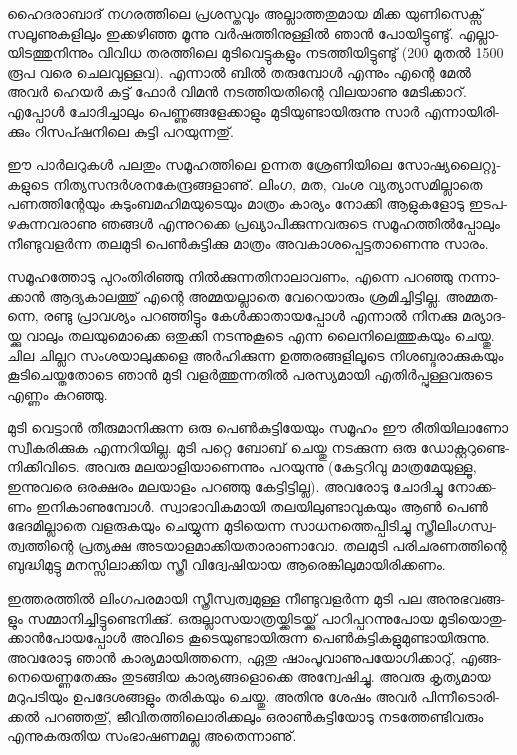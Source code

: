 ­ഹൈ­ദ­രാ­ബാ­ദ് നഗ­ര­ത്തി­ലെ പ്ര­ശ­സ്ത­വും അല്ലാ­ത്ത­തു­മായ മി­ക്ക യു­ണി­സെ­ക്സ് സലൂ­ണു­ക­ളി­ലും ഇക്ക­ഴി­ഞ്ഞ മൂ­ന്നു 
വര്‍­ഷ­ത്തി­നു­ള്ളില്‍ ഞാന്‍ പോ­യി­ട്ടു­ണ്ടു്. എല്ലാ­യി­ട­ത്തു­നി­ന്നും വി­വിധ തര­ത്തി­ലെ മു­ടി­വെ­ട്ടു­ക­ളും നട­ത്തി­യി­ട്ടു­ണ്ടു് (200 
‌മു­തല്‍ 1500 രൂപ വരെ ചെ­ല­വു­ള്ള­വ). എന്നാല്‍ ബില്‍ തരു­മ്പോള്‍ എന്നും എന്റെ മേല്‍ അവര്‍ ഹെ­യര്‍ കട്ട് ഫോര്‍ 
വി­മന്‍ നട­ത്തി­യ­തി­ന്റെ വി­ല­യാ­ണു മേ­ടി­ക്കാ­റ്. എപ്പോള്‍ ചോ­ദി­ച്ചാ­ലും പെ­ണ്ണു­ങ്ങ­ളേ­ക്കാ­ളും മു­ടി­യു­ണ്ടാ­യി­രു­ന്നു സാര്‍ 
എന്നാ­യി­രി­ക്കും റി­സ­പ്ഷ­നി­ലെ കു­ട്ടി പറ­യു­ന്ന­തു്.

ഈ പാര്‍­ല­റു­കള്‍ പല­തും സമൂ­ഹ­ത്തി­ലെ ഉന്നത ശ്രേ­ണി­യി­ലെ സോ­ഷ്യ­ലൈ­റ്റു­ക­ളു­ടെ നി­ത്യ­സ­ന്ദര്‍­ശ­ന­കേ­ന്ദ്ര­ങ്ങ­ളാ­ണു്. 
ലിം­ഗ, മത, വംശ വ്യ­ത്യാ­സ­മി­ല്ലാ­തെ പണ­ത്തി­ന്റേ­യും കു­ടും­ബ­മ­ഹി­മ­യു­ടെ­യും മാ­ത്രം കാ­ര്യം നോ­ക്കി ആളു­ക­ളോ­ടു 
ഇട­പ­ഴ­കു­ന്ന­വ­രാ­ണു ഞങ്ങള്‍ എന്നു­റ­ക്കെ പ്ര­ഖ്യാ­പി­ക്കു­ന്ന­വ­രു­ടെ സമൂ­ഹ­ത്തില്‍­പ്പോ­ലും നീ­ണ്ടു­വ­ളര്‍­ന്ന തല­മു­ടി പെണ്‍­കു­ട്ടി­ക്കു 
മാ­ത്രം അവ­കാ­ശ­പ്പെ­ട്ട­താ­ണെ­ന്നു സാ­രം­.

­സ­മൂ­ഹ­ത്തോ­ടു പു­റം­തി­രി­ഞ്ഞു നില്‍­ക്കു­ന്ന­തി­നാ­ലാ­വ­ണം, എന്നെ പറ­ഞ്ഞു നന്നാ­ക്കാന്‍ ആദ്യ­കാ­ല­ത്തു് എന്റെ 
അമ്മ­യ­ല്ലാ­തെ വേ­റെ­യാ­രും ശ്ര­മി­ച്ചി­ട്ടി­ല്ല. അമ്മ­ത­ന്നെ, രണ്ടു പ്രാ­വ­ശ്യം പറ­ഞ്ഞി­ട്ടും കേള്‍­ക്കാ­താ­യ­പ്പോള്‍ എന്നാല്‍ 
നി­ന­ക്കു മര്യാ­ദ­യ്ക്കു വാ­ലും തല­യു­മൊ­ക്കെ ഒതു­ക്കി നട­ന്നു­കൂ­ടെ എന്ന ലൈ­നി­ലെ­ത്തു­ക­യും ചെ­യ്തു. ചില ചി­ല്ലറ 
സം­ശ­യാ­ലു­ക്ക­ളെ അര്‍­ഹി­ക്കു­ന്ന ഉത്ത­ര­ങ്ങ­ളി­ലൂ­ടെ നി­ശ­ബ്ദ­രാ­ക്കു­ക­യും കൂ­ടി­ചെ­യ്ത­തോ­ടെ ഞാന്‍ മു­ടി വളര്‍­ത്തു­ന്ന­തില്‍ 
പര­സ്യ­മാ­യി എതിര്‍­പ്പു­ള്ള­വ­രു­ടെ എണ്ണം കു­റ­ഞ്ഞു­.

­മു­ടി വെ­ട്ടാന്‍ തീ­രു­മാ­നി­ക്കു­ന്ന ഒരു പെണ്‍­കു­ട്ടി­യേ­യും സമൂ­ഹം ഈ രീ­തി­യി­ലാ­ണോ സ്വീ­ക­രി­ക്കുക എന്ന­റി­യി­ല്ല. മു­ടി പറ്റെ 
ബോ­ബ് ചെ­യ്തു നട­ക്കു­ന്ന ഒരു ഡോ­ക്റ്റ­റു­ണ്ടെ­നി­ക്കി­വി­ടെ. അവ­രു മല­യാ­ളി­യാ­ണെ­ന്നും പറ­യു­ന്നു (കേ­ട്ട­റി­വു മാ­ത്ര­മേ­യു­ള്ളൂ, 
ഇന്നു­വ­രെ ഒര­ക്ഷ­രം മല­യാ­ളം പറ­ഞ്ഞു കേ­ട്ടി­ട്ടി­ല്ല). അവ­രോ­ടു ചോ­ദി­ച്ചു നോ­ക്ക­ണം ഇനി­കാ­ണു­മ്പോള്‍. സ്വാ­ഭാ­വി­ക­മാ­യി 
തല­യി­ലു­ണ്ടാ­വു­ക­യും ആണ്‍ പെണ്‍ ഭേ­ദ­മി­ല്ലാ­തെ വള­രു­ക­യും ചെ­യ്യു­ന്ന മു­ടി­യെ­ന്ന സാ­ധ­ന­ത്തെ­പ്പി­ടി­ച്ചു 
സ്ത്രീ­ലിം­ഗ­സ്വ­ത്വ­ത്തി­ന്റെ പ്ര­ത്യ­ക്ഷ അട­യാ­ള­മാ­ക്കി­യ­താ­രാ­ണാ­വോ. തല­മു­ടി പരി­ച­ര­ണ­ത്തി­ന്റെ ബു­ദ്ധി­മു­ട്ടു മന­സ്സി­ലാ­ക്കിയ സ്ത്രീ 
വി­ദ്വേ­ഷി­യായ ആരെ­ങ്കി­ലു­മാ­യി­രി­ക്ക­ണം­.

ഇ­ത്ത­ര­ത്തില്‍ ലിം­ഗ­പ­ര­മാ­യി സ്ത്രീ­സ്വ­ത്വ­മു­ള്ള നീ­ണ്ടു­വ­ളര്‍­ന്ന മു­ടി പല അനു­ഭ­വ­ങ്ങ­ളും സമ്മാ­നി­ച്ചി­ട്ടു­ണ്ടെ­നി­ക്കു്. 
ഒരു­ല്ലാ­സ­യാ­ത്ര­യ്ക്കി­ട­യ്ക്കു് പാ­റി­പ്പ­റ­ന്നു­പോയ മു­ടി­യൊ­തു­ക്കാന്‍­പോ­യ­പ്പോള്‍ അവി­ടെ കൂ­ടെ­യു­ണ്ടാ­യി­രു­ന്ന 
പെണ്‍­കു­ട്ടി­ക­ളു­മു­ണ്ടാ­യി­രു­ന്നു. അവ­രോ­ടു ഞാന്‍ കാ­ര്യ­മാ­യി­ത്ത­ന്നെ, ഏതു ഷാം­പൂ­വാ­ണു­പ­യോ­ഗി­ക്കാ­റു്, എങ്ങ­നെ­യെ­ണ്ണ­തേ­ക്കും 
തു­ട­ങ്ങിയ കാ­ര്യ­ങ്ങ­ളൊ­ക്കെ അന്വേ­ഷി­ച്ചു. അവ­രു കൃ­ത്യ­മായ മറു­പ­ടി­യും ഉപ­ദേ­ശ­ങ്ങ­ളും തരി­ക­യും ചെ­യ്തു. അതി­നു ശേ­ഷം അവര്‍ പി­ന്നീ­ടൊ­രി­ക്കല്‍ പറ­ഞ്ഞ­തു്, ജീ­വി­ത­ത്തി­ലൊ­രി­ക്ക­ലും ഒരാണ്‍­കു­ട്ടി­യോ­ടു നട­ത്തേ­ണ്ടി­വ­രും എന്നു­ക­രു­തിയ സം­ഭാ­ഷ­ണ­മ­ല്ല 
അതെ­ന്നാ­ണു്.

